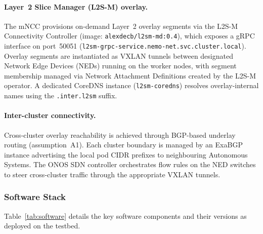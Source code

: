 \paragraph{Layer~2 Slice Manager (L2S-M) overlay.}
The mNCC provisions on-demand Layer~2 overlay segments via the
L2S-M Connectivity Controller (image: \texttt{alexdecb/l2sm-md:0.4}),
which exposes a gRPC interface on port~50051
(\texttt{l2sm-grpc-service.nemo-net.svc.cluster.local}).
Overlay segments are instantiated as VXLAN tunnels between
designated Network Edge Devices (NEDs) running on the worker nodes,
with segment membership managed via Network Attachment Definitions
created by the L2S-M operator.
A dedicated CoreDNS instance
(\texttt{l2sm-coredns}) resolves overlay-internal names using the
\texttt{.inter.l2sm} suffix.

\paragraph{Inter-cluster connectivity.}
Cross-cluster overlay reachability is achieved through BGP-based
underlay routing (assumption~A1).
Each cluster boundary is managed by an ExaBGP instance advertising
the local pod CIDR prefixes to neighbouring Autonomous Systems.
The ONOS SDN controller orchestrates flow rules on the NED
switches to steer cross-cluster traffic through the appropriate
VXLAN tunnels.

\subsubsection{Software Stack}
\label{subsubsec:software_stack}

Table~\ref{tab:software} details the key software components and
their versions as deployed on the testbed.

